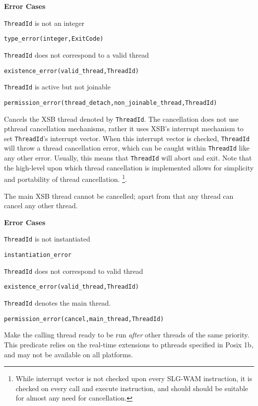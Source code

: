\begin{description}
{\bf Error Cases}
\bi
\item 	{\tt ThreadId} is not an integer
\bi
\item 	{\tt type\_error(integer,ExitCode)}
\ei
\item   {\tt ThreadId} does not correspond to a valid thread
\bi
\item   {\tt existence\_error(valid\_thread,ThreadId)}
\ei
\item 	{\tt ThreadId} is active but not joinable
\bi
\item 	{\tt permission\_error(thread\_detach,non\_joinable\_thread,ThreadId)}
\ei
\ei

%
Cancels the XSB thread denoted by {\tt ThreadId}.  The cancellation
does not use pthread cancellation mechanisms, rather it uses XSB's
interrupt mechanism to set {\tt ThreadId}'s interrupt vector.  When
this interrupt vector is checked, {\tt ThreadId} will throw a thread
cancellation error, which can be caught within {\tt ThreadId} like any
other error.  Usually, this means that {\tt ThreadId} will abort and
exit.  Note that the high-level upon which thread cancellation is
implemented allows for simplicity and portability of thread
cancellation.  \footnote{While interrupt vector is not checked upon
  every SLG-WAM instruction, it is checked on every {\sf call} and
  {\sf execute} instruction, and should should be suitable for almost
  any need for cancellation.}.

The main XSB thread cannot be cancelled; apart from that any thread
can cancel any other thread.

{\bf Error Cases}
\bi
\item 	{\tt ThreadId} is not instantiated
\bi
\item 	{\tt instantiation\_error}
\ei
%
\item   {\tt ThreadId} does not correspond to valid thread
\bi
\item   {\tt existence\_error(valid\_thread,ThreadId)}
\ei
\item   {\tt ThreadId} denotes the main thread.
\bi
\item   {\tt permission\_error(cancel,main\_thread,ThreadId)}
\ei
\ei

% 
Make the calling thread ready to be run {\em after} other threads of
the same priority.  This predicate relies on the real-time extensions
to pthreads specified in Posix 1b, and may not be available on all
platforms.


\end{description}
